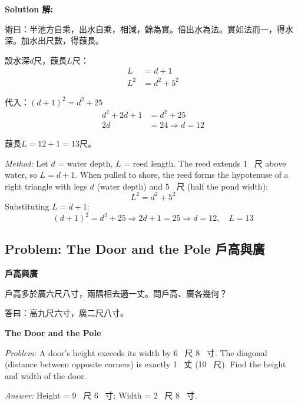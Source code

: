 \documentclass[11pt,a4paper]{article}
\newcommand{\zh}[1]{{\CJKfamily{\CJKrmdefault} #1}}
\newenvironment{chside}{%
  \begin{minipage}[t]{0.48\textwidth}%
  \setlength{\parindent}{1.5em}%
  \linespread{1.25}\selectfont%
  \small%
}{%
  \end{minipage}%
}
\newenvironment{enside}{%
  \hfill\begin{minipage}[t]{0.48\textwidth}%
  \setlength{\parindent}{1em}%
  \linespread{1.15}\selectfont%
  \small%
}{%
  \end{minipage}%
}
\newenvironment{solution}{%
  \par\medskip\noindent\textbf{\textcolor{notecolor}{Solution \zh{解}:}}\par\nopagebreak
  \small\setlength{\parindent}{1em}%
}{%
  \par\medskip%
}
\begin{document}
\begin{solution}
\noindent\begin{chside}
\zh{術曰：半池方自乘，出水自乘，相減，餘為實。倍出水為法。實如法而一，得水深。加水出尺數，得葭長。}

設水深$d$尺，葭長$L$尺：
\begin{align*}
L &= d + 1 \\
L^2 &= d^2 + 5^2
\end{align*}

代入：$(d+1)^2 = d^2 + 25$
\begin{align*}
d^2 + 2d + 1 &= d^2 + 25 \\
2d &= 24 \Rightarrow d = 12
\end{align*}

葭長$L = 12 + 1 = 13$尺。
\end{chside}%
\begin{enside}
\textit{Method:} Let $d$ = water depth, $L$ = reed length. The reed extends
1~\zh{尺} above water, so $L = d + 1$. When pulled to shore, the reed forms
the hypotenuse of a right triangle with legs $d$ (water depth) and 5~\zh{尺}
(half the pond width):
\[
L^2 = d^2 + 5^2
\]
Substituting $L = d + 1$:
\[
(d+1)^2 = d^2 + 25 \Rightarrow 2d + 1 = 25 \Rightarrow d = 12, \quad L = 13
\]
\end{enside}
\end{solution}

\subsection{Problem: The Door and the Pole \zh{戶高與廣}}

\noindent\begin{chside}
\noindent\textbf{戶高與廣}

\zh{戶高多於廣六尺八寸，兩隅相去適一丈。問戶高、廣各幾何？}

\medskip
\zh{答曰：高九尺六寸，廣二尺八寸。}
\end{chside}%
\begin{enside}
\noindent\textbf{The Door and the Pole}

\textit{Problem:} A door's height exceeds its width by 6~\zh{尺} 8~\zh{寸}.
The diagonal (distance between opposite corners) is exactly 1~\zh{丈} (10~\zh{尺}). Find the height and width of the door.

\medskip
\textit{Answer:} Height = 9~\zh{尺} 6~\zh{寸}; Width = 2~\zh{尺} 8~\zh{寸}.
\end{enside}
\end{document}
